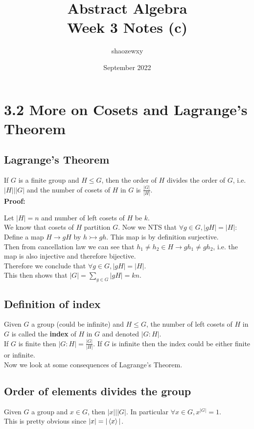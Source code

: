 \documentclass{article}
\title{Abstract Algebra\\
\large{Week 3 Notes (c)}}
\author{shaozewxy }
\date{September 2022}
\begin{document}
\maketitle
\section*{3.2 More on Cosets and Lagrange's Theorem}
\subsection*{Lagrange's Theorem}
If $G$ is a finite group and $H \leq G$, then the order of $H$ divides the order of $G$, i.e. $|H| \big| |G|$ and the number of cosets of $H$ in $G$ is $\frac{|G|}{|H|}$.\\
\textbf{Proof:}
\begin{addmargin}[1em]{0em}
    Let $|H| = n$ and number of left cosets of $H$ be $k$.\\
    We know that cosets of $H$ partition $G$. Now we NTS that $\forall g \in G, |gH| = |H|$:\\
    Define a map $H \rightarrow gH$ by $h \rightarrowtail gh$. This map is by definition surjective.\\
    Then from cancellation law we can see that $h_1 \neq h_2 \in H \rightarrow gh_1 \neq gh_2$, i.e. the map is also injective and therefore bijective.\\
    Therefore we conclude that $\forall g \in G, |gH| = |H|$.\\
    This then shows that $|G| = \sum_{g\in G} |gH| = kn$.
\end{addmargin}
\subsection*{Definition of index}
Given $G$ a group (could be infinite) and $H \leq G$, the number of left cosets of $H$ in $G$ is called the \textbf{index} of $H$ in $G$ and denoted $|G:H|$.\\
If $G$ is finite then $|G:H| = \frac{|G|}{|H|}$. If $G$ is infinite then the index could be either finite or infinite.\\
Now we look at some consequences of Lagrange's Theorem.
\subsection*{Order of elements divides the group}
Given $G$ a group and $x \in G$, then $|x| \big| |G|$. In particular $\forall x \in G, x^{|G|} = 1$.\\
This is pretty obvious since $|x| = |\braket{x}|$.
\end{document}
